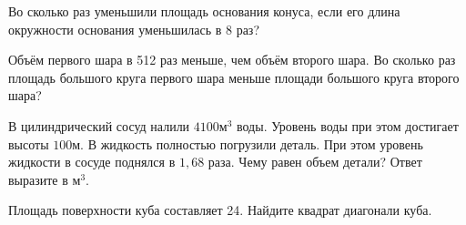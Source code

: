 \documentclass[4apaper]{article}
\begin{document}
\begin{taskBN}{3}
Во сколько раз уменьшили площадь основания конуса, если его длина окружности основания уменьшилась в 8 раз?
\end{taskBN}

\begin{taskBN}{4}
Объём первого шара в 512 раз меньше, чем объём второго шара. Во сколько раз площадь большого круга первого шара меньше площади большого круга второго шара?
\end{taskBN}

\begin{taskBN}{5}
В цилиндрический сосуд налили $4100\mbox{м}^3$ воды. Уровень воды при этом достигает высоты $100$м. В жидкость полностью погрузили деталь. При этом уровень жидкости в сосуде поднялся в $ 1{,}68 $ раза. Чему равен объем детали? Ответ выразите в $\mbox{м}^3$.
\end{taskBN}

\begin{taskBN}{6}
Площадь поверхности куба составляет 24. Найдите квадрат диагонали куба.
\end{taskBN}
\end{document}
